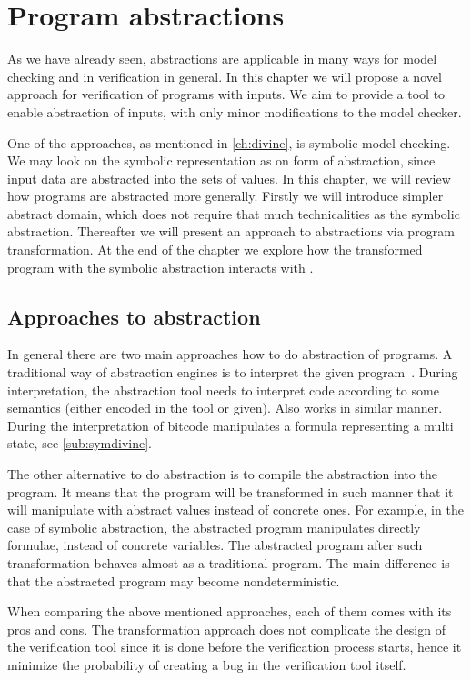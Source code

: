 \chapter{Program abstractions}\label{ch:abstraction}

As we have already seen, abstractions are applicable in many ways for model
checking and in verification in general. In this chapter we will propose a novel
approach for verification of programs with inputs. We aim to provide a tool to
enable abstraction of inputs, with only minor modifications to the model
checker.

One of the approaches, as mentioned in \autoref{ch:divine}, is symbolic model
checking. We may look on the symbolic representation as on form of abstraction,
since input data are abstracted into the sets of values. In this chapter, we will
review how programs are abstracted more generally. Firstly we will introduce
simpler abstract domain, which does not require that much technicalities as
the symbolic abstraction. Thereafter we will present an approach to abstractions via
program transformation. At the end of the chapter we explore how the transformed
program with the symbolic abstraction interacts with \DIVINE.

\section{Approaches to abstraction}

In general there are two main approaches how to do abstraction of programs.  A
traditional way of abstraction engines is to interpret the given
program~\cite{Cousot79}. During interpretation, the abstraction tool needs to
interpret code according to some semantics (either encoded in the tool or
given). Also \SymDIVINE works in similar manner. During the interpretation of \LLVM
bitcode \SymDIVINE manipulates a formula representing a multi
state, see \autoref{sub:symdivine}.

The other alternative to do abstraction is to compile the abstraction into the
program. It means that the program will be transformed in such manner that it will
manipulate with abstract values instead of concrete ones. For example, in the
case of symbolic abstraction, the abstracted program manipulates directly
formulae, instead of concrete variables. The abstracted program after such
transformation behaves almost as a traditional program. The main difference is
that the abstracted program may become nondeterministic.

When comparing the above mentioned approaches, each of them comes with its pros
and cons. The transformation approach does not complicate the design of the
verification tool since it is done before the verification process starts, hence
it minimize the probability of creating a bug in the verification tool itself.

